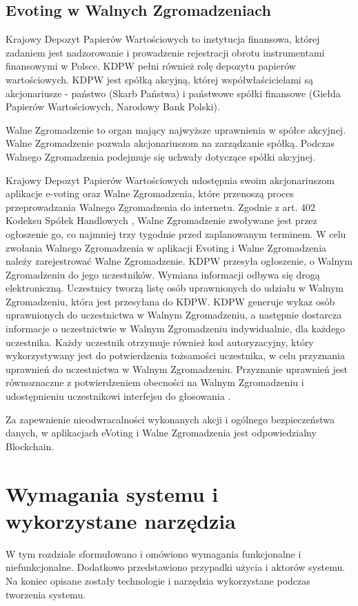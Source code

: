 \documentclass[a4paper,12pt]{book}
\begin{document}
\section{Evoting w Walnych Zgromadzeniach}

Krajowy Depozyt Papierów Wartościowych to instytucja finansowa, której zadaniem jest nadzorowanie i prowadzenie rejestracji obrotu instrumentami finansowymi w Polsce. KDPW pełni również rolę depozytu papierów wartościowych. KDPW jest spółką akcyjną, której współwłaścicielami są akcjonariusze - państwo (Skarb Państwa) i państwowe spółki finansowe (Giełda Papierów Wartościowych, Narodowy Bank Polski).

Walne Zgromadzenie to organ mający najwyższe uprawnienia w spółce akcyjnej. Walne Zgromadzenie pozwala akcjonariuszom na zarządzanie spółką. Podczas Walnego Zgromadzenia podejmuje się uchwały dotyczące spółki akcyjnej.

Krajowy Depozyt Papierów Wartościowych udostępnia swoim akcjonariuszom aplikacje e-voting oraz Walne Zgromadzenia, które przenoszą proces przeprowadzania Walnego Zgromadzenia do internetu. Zgodnie z art. 402 Kodeksu Spółek Handlowych \cite{sp-han}, Walne Zgromadzenie zwoływane jest przez ogłoszenie go, co najmniej trzy tygodnie przed zaplanowanym terminem. W celu zwołania Walnego Zgromadzenia w aplikacji Evoting i Walne Zgromadzenia należy zarejestrować Walne Zgromadzenie. KDPW przesyła ogłoszenie, o Walnym Zgromadzeniu do jego uczestników. Wymiana informacji odbywa się drogą elektroniczną.
Uczestnicy tworzą listę osób uprawnionych do udziału w Walnym Zgromadzeniu, która jest przesyłana do KDPW. KDPW generuje wykaz osób uprawnionych do uczestnictwa w Walnym Zgromadzeniu, a następnie dostarcza informacje o uczestnictwie w Walnym Zgromadzeniu indywidualnie, dla każdego uczestnika. Każdy uczestnik otrzymuje również kod autoryzacyjny, który wykorzystywany jest do potwierdzenia tożsamości uczestnika, w celu przyznania uprawnień do uczestnictwa w Walnym Zgromadzeniu. Przyznanie uprawnień jest równoznaczne z potwierdzeniem obecności na Walnym Zgromadzeniu i udostępnieniu uczestnikowi interfejsu do głosowania \cite{eVoting-dzialanie}.

Za zapewnienie nieodwracalności wykonanych akcji i ogólnego bezpieczeństwa danych, w aplikacjach eVoting i Walne Zgromadzenia jest odpowiedzialny Blockchain.

\chapter{Wymagania systemu i wykorzystane narzędzia}
W tym rozdziale sformułowano i omówiono wymagania funkcjonalne i niefunkcjonalne. Dodatkowo przedstawiono przypadki użycia i aktorów systemu. Na koniec opisane zostały technologie i narzędzia wykorzystane podczas tworzenia systemu.
\end{document}
